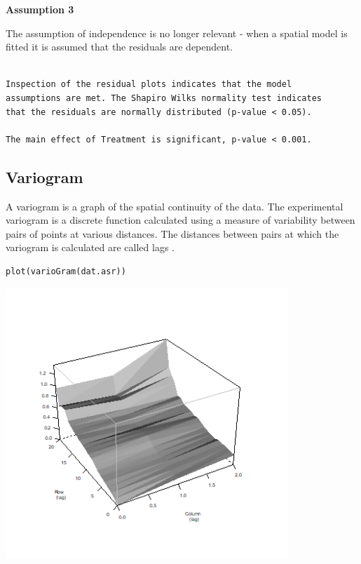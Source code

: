 \documentclass[a4paper, 10pt, fleqn, twosided]{memoir}
\begin{document}
\textbf{Assumption 3}

The assumption of independence is no longer relevant - when a spatial model is fitted it is assumed that the residuals
are dependent.

\begin{tcolorbox}[title = Example 6 Output Interpretation]
\begin{verbatim}

Inspection of the residual plots indicates that the model
assumptions are met. The Shapiro Wilks normality test indicates
that the residuals are normally distributed (p-value < 0.05).

The main effect of Treatment is significant, p-value < 0.001.
\end{verbatim}
\end{tcolorbox}

\subsection{Variogram}
A variogram is a graph of the spatial continuity of the data. The experimental
variogram is a discrete function calculated using a measure of variability
between pairs of points at various distances. The distances between pairs at
which the variogram is calculated are called lags .

\begin{tcolorbox}[title = Producing a variogram]
\begin{verbatim}
plot(varioGram(dat.asr))
\end{verbatim}
\end{tcolorbox}

\begin{tcolorbox}[title = Example 6 Variogram]
\includegraphics[width=0.8\textwidth, frame]{Example6Variogram.png}
\end{tcolorbox}
\end{document}
